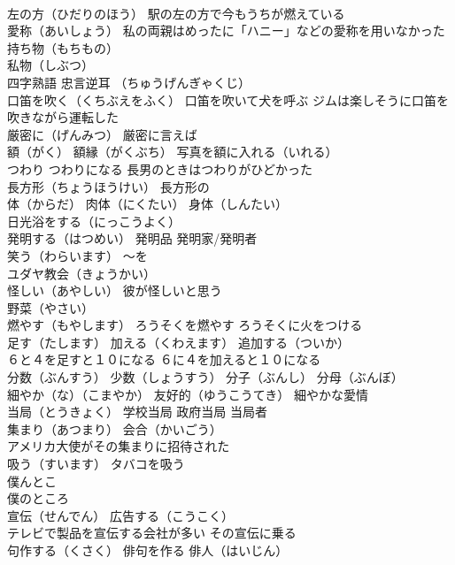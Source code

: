 \documentclass[8pt]{extreport}
\begin{document}
\begin{CJK}{UTF8}{min}
\\	左の方（ひだりのほう） 駅の左の方で今もうちが燃えている
\\	愛称（あいしょう） 私の両親はめったに「ハニー」などの愛称を用いなかった
\\	持ち物（もちもの） 
\\	私物（しぶつ） 
\\	四字熟語	忠言逆耳 （ちゅうげんぎゃくじ）
\\	口笛を吹く（くちぶえをふく） 口笛を吹いて犬を呼ぶ ジムは楽しそうに口笛を吹きながら運転した
\\	厳密に（げんみつ） 厳密に言えば
\\	額（がく） 額縁（がくぶち） 写真を額に入れる（いれる）
\\	つわり つわりになる 長男のときはつわりがひどかった
\\	長方形（ちょうほうけい） 長方形の
\\	体（からだ） 肉体（にくたい） 身体（しんたい）
\\	日光浴をする（にっこうよく）
\\	発明する（はつめい） 発明品 発明家/発明者
\\	笑う（わらいます） ～を
\\	ユダヤ教会（きょうかい）
\\	怪しい（あやしい） 彼が怪しいと思う
\\	野菜（やさい）
\\	燃やす（もやします） ろうそくを燃やす ろうそくに火をつける
\\	足す（たします） 加える（くわえます） 追加する（ついか）
\\	６と４を足すと１０になる ６に４を加えると１０になる
\\	分数（ぶんすう） 少数（しょうすう） 分子（ぶんし） 分母（ぶんぼ）
\\	細やか（な）（こまやか） 友好的（ゆうこうてき） 細やかな愛情
\\	当局（とうきょく） 学校当局 政府当局 当局者
\\	集まり（あつまり） 会合（かいごう）
\\	アメリカ大使がその集まりに招待された
\\	吸う（すいます） タバコを吸う
\\	僕んとこ 
\\	僕のところ
\\	宣伝（せんでん） 広告する（こうこく）
\\	テレビで製品を宣伝する会社が多い その宣伝に乗る
\\	句作する（くさく） 俳句を作る 俳人（はいじん）

\end{CJK}
\end{document}

